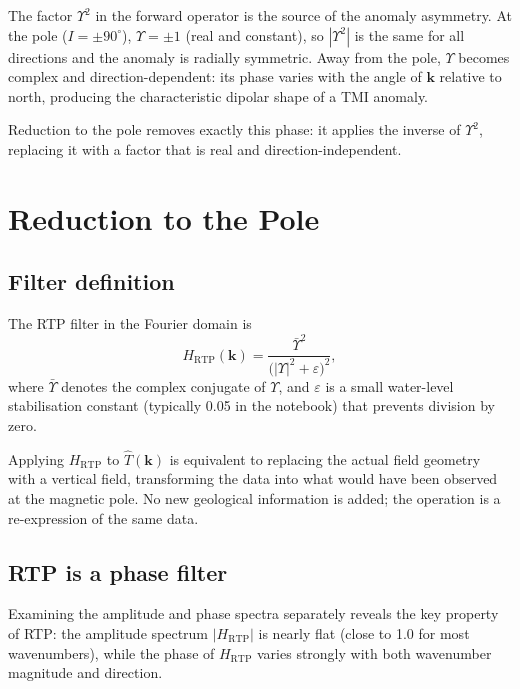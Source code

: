 \documentclass[11pt,a4paper]{article}
\begin{document}
The factor $\Upsilon^2$ in the forward operator is the source of the anomaly
asymmetry.
At the pole ($I = \pm 90^\circ$), $\Upsilon = \pm 1$ (real and constant),
so $|\Upsilon^2|$ is the same for all directions and the anomaly is radially
symmetric.
Away from the pole, $\Upsilon$ becomes complex and direction-dependent:
its phase varies with the angle of $\mathbf{k}$ relative to north, producing
the characteristic dipolar shape of a TMI anomaly.

Reduction to the pole removes exactly this phase: it applies the inverse of
$\Upsilon^2$, replacing it with a factor that is real and direction-independent.

\section{Reduction to the Pole}

\subsection{Filter definition}

The RTP filter in the Fourier domain is
\begin{equation}
H_\text{RTP}(\mathbf{k})
  = \frac{\bar{\Upsilon}^2}
         {\bigl(|\Upsilon|^2 + \varepsilon\bigr)^2},
\end{equation}
where $\bar{\Upsilon}$ denotes the complex conjugate of $\Upsilon$,
and $\varepsilon$ is a small water-level stabilisation constant
(typically 0.05 in the notebook) that prevents division by zero.

Applying $H_\text{RTP}$ to $\hat{T}(\mathbf{k})$ is equivalent to replacing
the actual field geometry with a vertical field, transforming the data into
what would have been observed at the magnetic pole.
No new geological information is added; the operation is a re-expression of
the same data.

\subsection{RTP is a phase filter}

Examining the amplitude and phase spectra separately reveals the key property
of RTP: the amplitude spectrum $|H_\text{RTP}|$ is nearly flat (close to 1.0
for most wavenumbers), while the phase of $H_\text{RTP}$ varies strongly with
both wavenumber magnitude and direction.
\end{document}
